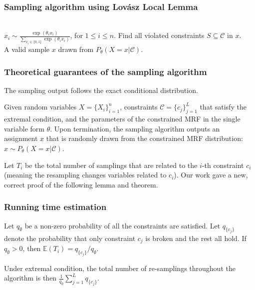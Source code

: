 \documentclass{beamer}
\newcommand{\e}{\mathbb{E}}
\newcommand{\lovasz}{{Lov\'asz}\xspace}
\newcommand{\var}{\mathtt{var}}
\begin{document}
\begin{frame}
  \frametitle{Sampling algorithm using \lovasz Local Lemma}
  \begin{algorithmic}[t]
    \\
    \State $x_i\sim\frac{\exp(\theta_i x_i)}{\sum_{x_i\in \{0,1\}}\exp(\theta_ix_i)}$, for $1\leq i\leq n$. 
    \State Find all violated constraints $S\subseteq \mathcal{C}$ in $x$.
    \State {$x_k{\sim}\frac{\exp(\theta_k x_k)}{\underset{{x_k\in \{0,1\}}}{\sum}\exp(\theta_k x_k)}, \text{for } x_k \in \var(S)$.}
    \EndWhile \\
    \Return  A valid sample $x$ drawn from $P_{\theta}(X=x|\mathcal{C})$.
  \end{algorithmic}
\end{frame}

\begin{frame}
  \frametitle{Theoretical guarantees of the sampling algorithm}
  The sampling output follows the exact conditional distribution.
  \begin{theorem} \label{th:product-dist}
    Given  random variables $X=\{X_{i}\}_{i=1}^n$, constraints $\mathcal{C}=\{c_j\}_{j=1}^L$ that satisfy the extremal condition, and the parameters of the constrained MRF in the single variable form  $\theta$. Upon termination, the sampling algorithm outputs an assignment $x$ that is randomly drawn from the constrained MRF distribution: $x\sim P_\theta(X=x | \mathcal{C})$.
  \end{theorem}
\end{frame}

\begin{frame}
  Let $T_i$ be the total number of samplings that are related to the $i$-th constraint $c_i$ (meaning the resampling changes variables related to $c_i$). Our work gave a new, correct proof of the following lemma and theorem.
  \frametitle{Running time estimation}
  \begin{lemma} Let $q_{\emptyset}$ be a non-zero probability of all the constraints are satisfied. Let $q_{\{c_j\}}$ denote the probability that only constraint $c_j$ is broken and the rest all hold. If $q_\emptyset>0$, then
    $\e(T_i) ={q_{\{c_j\}}}/{q_\emptyset}$.
  \end{lemma}
  \begin{theorem}Under extremal condition,
    the total number of re-samplings throughout the algorithm is then $\frac{1}{q_{\emptyset}}\sum_{j=1}^L q_{\{c_j\}}$.
  \end{theorem}
\end{frame}
\end{document}
